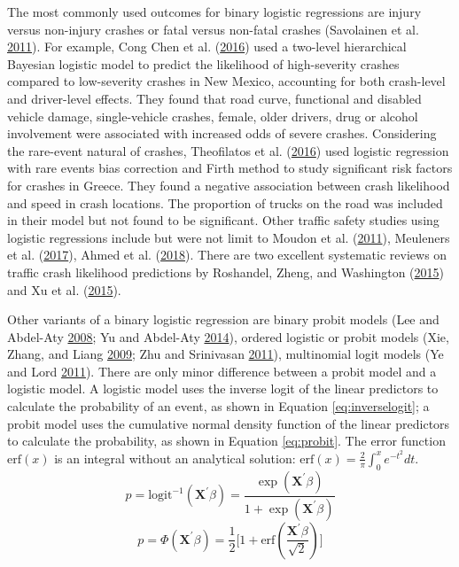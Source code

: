 \documentclass[12pt]{book}
\numberwithin{equation}{chapter}
\begin{document}
The most commonly used outcomes for binary logistic regressions are injury versus non-injury crashes or fatal versus non-fatal crashes (Savolainen et al. \protect\hyperlink{ref-savolainen2011statistical}{2011}). For example, Cong Chen et al. (\protect\hyperlink{ref-chen2016driver}{2016}) used a two-level hierarchical Bayesian logistic model to predict the likelihood of high-severity crashes compared to low-severity crashes in New Mexico, accounting for both crash-level and driver-level effects. They found that road curve, functional and disabled vehicle damage, single-vehicle crashes, female, older drivers, drug or alcohol involvement were associated with increased odds of severe crashes. Considering the rare-event natural of crashes, Theofilatos et al. (\protect\hyperlink{ref-theofilatos2016predicting}{2016}) used logistic regression with rare events bias correction and Firth method to study significant risk factors for crashes in Greece. They found a negative association between crash likelihood and speed in crash locations. The proportion of trucks on the road was included in their model but not found to be significant. Other traffic safety studies using logistic regressions include but were not limit to Moudon et al. (\protect\hyperlink{ref-moudon2011risk}{2011}), Meuleners et al. (\protect\hyperlink{ref-meuleners2017determinants}{2017}), Ahmed et al. (\protect\hyperlink{ref-ahmed2018effects}{2018}). There are two excellent systematic reviews on traffic crash likelihood predictions by Roshandel, Zheng, and Washington (\protect\hyperlink{ref-roshandel2015impact}{2015}) and Xu et al. (\protect\hyperlink{ref-xu2015calibration}{2015}).

Other variants of a binary logistic regression are binary probit models (Lee and Abdel-Aty \protect\hyperlink{ref-lee2008presence}{2008}; Yu and Abdel-Aty \protect\hyperlink{ref-yu2014using}{2014}), ordered logistic or probit models (Xie, Zhang, and Liang \protect\hyperlink{ref-xie2009crash}{2009}; Zhu and Srinivasan \protect\hyperlink{ref-zhu2011comprehensive}{2011}), multinomial logit models (Ye and Lord \protect\hyperlink{ref-ye2011investigation}{2011}). There are only minor difference between a probit model and a logistic model. A logistic model uses the inverse logit of the linear predictors to calculate the probability of an event, as shown in Equation \eqref{eq:inverselogit}; a probit model uses the cumulative normal density function of the linear predictors to calculate the probability, as shown in Equation \eqref{eq:probit}. The error function \(\text{erf}(x)\) is an integral without an analytical solution: \(\text{erf}(x) = \frac{2}{\pi}\int_0^xe^{-t^2}dt\).
\begin{equation}
p = \text{logit}^{-1}(\mathbf{X}^\prime\beta) = \frac{\exp (\mathbf{X}^\prime\beta)}{1 + \exp (\mathbf{X}^\prime\beta)}
\label{eq:inverselogit}
\end{equation}
\begin{equation}
p = \Phi(\mathbf{X}^\prime\beta) = \frac{1}{2}\Big[1+\text{erf}(\frac{\mathbf{X}^\prime\beta}{\sqrt 2})\Big]
\label{eq:probit}
\end{equation}
\end{document}
